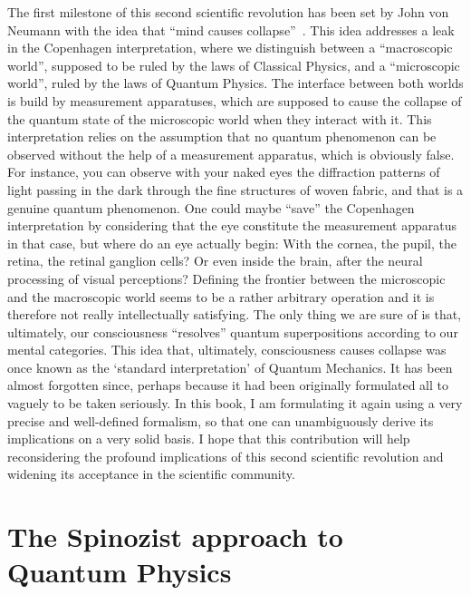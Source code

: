 The first milestone of this second scientific revolution has been set by John von Neumann with the idea that ``mind causes collapse''~\cite{Neumann1932}.
This idea addresses a leak in the Copenhagen interpretation, where we distinguish between a ``macroscopic world'', supposed to be ruled by the laws of Classical Physics, and a ``microscopic world'', ruled by the laws of Quantum Physics.
The interface between both worlds is build by measurement apparatuses, which are supposed to cause the collapse of the quantum state of the microscopic world when they interact with it.
This interpretation relies on the assumption that no quantum phenomenon can be observed without the help of a measurement apparatus, which is obviously false.
For instance, you can observe with your naked eyes the diffraction patterns of light passing in the dark through the fine structures of woven fabric, and that is a genuine quantum phenomenon.
One could maybe ``save'' the Copenhagen interpretation by considering that the eye constitute the measurement apparatus in that case, but where do an eye actually begin: With the cornea, the pupil, the retina, the retinal ganglion cells? Or even inside the brain, after the neural processing of visual perceptions? Defining the frontier between the microscopic and the macroscopic world seems to be a rather arbitrary operation and it is therefore not really intellectually satisfying.
The only thing we are sure of is that, ultimately, our consciousness ``resolves'' quantum superpositions according to our mental categories.
This idea that, ultimately, consciousness causes collapse was once known as the `standard interpretation' of Quantum Mechanics.
It has been almost forgotten since, perhaps because it had been originally formulated all to vaguely to be taken seriously.
In this book, I am formulating it again using a very precise and well-defined formalism, so that one can unambiguously derive its implications on a very solid basis.
I hope that this contribution will help reconsidering the profound implications of this second scientific revolution and widening its acceptance in the scientific community.

\section{The Spinozist approach to Quantum Physics}

